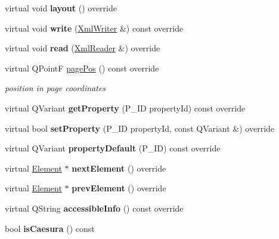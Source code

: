\begin{DoxyCompactItemize}
virtual void {\bfseries layout} () override
\item 
\mbox{\label{class_ms_1_1_breath_a146f749448ee986d5e49029656e397d2}} 
virtual void {\bfseries write} (\hyperlink{class_ms_1_1_xml_writer}{Xml\+Writer} \&) const override
\item 
\mbox{\label{class_ms_1_1_breath_a6fa0a1be32ac37de711942295888a35c}} 
virtual void {\bfseries read} (\hyperlink{class_ms_1_1_xml_reader}{Xml\+Reader} \&) override
\item 
\mbox{\label{class_ms_1_1_breath_ae078c873f238d76e6f840ed1f310902f}} 
virtual Q\+PointF \hyperlink{class_ms_1_1_breath_ae078c873f238d76e6f840ed1f310902f}{page\+Pos} () const override
\begin{DoxyCompactList}\small\item\em position in page coordinates \end{DoxyCompactList}\item 
\mbox{\label{class_ms_1_1_breath_ab52f6e5eecf039ec21b200121e4144bc}} 
virtual Q\+Variant {\bfseries get\+Property} (P\+\_\+\+ID property\+Id) const override
\item 
\mbox{\label{class_ms_1_1_breath_a2d7ced541a88bd671644512742787831}} 
virtual bool {\bfseries set\+Property} (P\+\_\+\+ID property\+Id, const Q\+Variant \&) override
\item 
\mbox{\label{class_ms_1_1_breath_ad0eaffd8456d21aca67ec3abc1c2dd47}} 
virtual Q\+Variant {\bfseries property\+Default} (P\+\_\+\+ID) const override
\item 
\mbox{\label{class_ms_1_1_breath_a373e59bbe328feb7165ad117ff7bdb86}} 
virtual \hyperlink{class_ms_1_1_element}{Element} $\ast$ {\bfseries next\+Element} () override
\item 
\mbox{\label{class_ms_1_1_breath_a875986c8f6f0cb32700421d752088ed6}} 
virtual \hyperlink{class_ms_1_1_element}{Element} $\ast$ {\bfseries prev\+Element} () override
\item 
\mbox{\label{class_ms_1_1_breath_a8182d22481f31c87c6732aae20d5caf6}} 
virtual Q\+String {\bfseries accessible\+Info} () const override
\item 
\mbox{\label{class_ms_1_1_breath_ac76d2627fe47681222355fd3f0580fe2}} 
bool {\bfseries is\+Caesura} () const
\end{DoxyCompactItemize}
